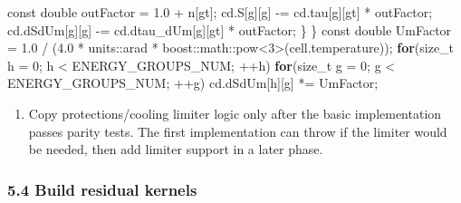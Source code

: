 \documentclass[
]{article}
\newenvironment{Shaded}{}{}
\newcommand{\AttributeTok}[1]{\textcolor[rgb]{0.49,0.56,0.16}{#1}}
\newcommand{\ControlFlowTok}[1]{\textcolor[rgb]{0.00,0.44,0.13}{\textbf{#1}}}
\newcommand{\DataTypeTok}[1]{\textcolor[rgb]{0.56,0.13,0.00}{#1}}
\newcommand{\DecValTok}[1]{\textcolor[rgb]{0.25,0.63,0.44}{#1}}
\newcommand{\ExtensionTok}[1]{#1}
\newcommand{\FloatTok}[1]{\textcolor[rgb]{0.25,0.63,0.44}{#1}}
\newcommand{\NormalTok}[1]{#1}
\newcommand{\OperatorTok}[1]{\textcolor[rgb]{0.40,0.40,0.40}{#1}}
\providecommand{\tightlist}{%
  \setlength{\itemsep}{0pt}\setlength{\parskip}{0pt}}
\begin{document}
\begin{Shaded}
\begin{Highlighting}[]
        \AttributeTok{const} \DataTypeTok{double}\NormalTok{ outFactor }\OperatorTok{=} \FloatTok{1.0} \OperatorTok{+}\NormalTok{ n}\OperatorTok{[}\NormalTok{gt}\OperatorTok{];}
\NormalTok{        cd}\OperatorTok{.}\NormalTok{S}\OperatorTok{[}\NormalTok{g}\OperatorTok{][}\NormalTok{g}\OperatorTok{]} \OperatorTok{{-}=}\NormalTok{ cd}\OperatorTok{.}\NormalTok{tau}\OperatorTok{[}\NormalTok{g}\OperatorTok{][}\NormalTok{gt}\OperatorTok{]} \OperatorTok{*}\NormalTok{ outFactor}\OperatorTok{;}
\NormalTok{        cd}\OperatorTok{.}\NormalTok{dSdUm}\OperatorTok{[}\NormalTok{g}\OperatorTok{][}\NormalTok{g}\OperatorTok{]} \OperatorTok{{-}=}\NormalTok{ cd}\OperatorTok{.}\NormalTok{dtau\_dUm}\OperatorTok{[}\NormalTok{g}\OperatorTok{][}\NormalTok{gt}\OperatorTok{]} \OperatorTok{*}\NormalTok{ outFactor}\OperatorTok{;}
    \OperatorTok{\}}
\OperatorTok{\}}
\AttributeTok{const} \DataTypeTok{double}\NormalTok{ UmFactor }\OperatorTok{=} \FloatTok{1.0} \OperatorTok{/} \OperatorTok{(}\FloatTok{4.0} \OperatorTok{*}\NormalTok{ units}\OperatorTok{::}\NormalTok{arad }\OperatorTok{*} \ExtensionTok{boost::}\NormalTok{math::pow}\OperatorTok{\textless{}}\DecValTok{3}\OperatorTok{\textgreater{}(}\NormalTok{cell}\OperatorTok{.}\NormalTok{temperature}\OperatorTok{));}
\ControlFlowTok{for}\OperatorTok{(}\DataTypeTok{size\_t}\NormalTok{ h }\OperatorTok{=} \DecValTok{0}\OperatorTok{;}\NormalTok{ h }\OperatorTok{\textless{}}\NormalTok{ ENERGY\_GROUPS\_NUM}\OperatorTok{;} \OperatorTok{++}\NormalTok{h}\OperatorTok{)}
    \ControlFlowTok{for}\OperatorTok{(}\DataTypeTok{size\_t}\NormalTok{ g }\OperatorTok{=} \DecValTok{0}\OperatorTok{;}\NormalTok{ g }\OperatorTok{\textless{}}\NormalTok{ ENERGY\_GROUPS\_NUM}\OperatorTok{;} \OperatorTok{++}\NormalTok{g}\OperatorTok{)}
\NormalTok{        cd}\OperatorTok{.}\NormalTok{dSdUm}\OperatorTok{[}\NormalTok{h}\OperatorTok{][}\NormalTok{g}\OperatorTok{]} \OperatorTok{*=}\NormalTok{ UmFactor}\OperatorTok{;}
\end{Highlighting}
\end{Shaded}

\begin{enumerate}
\def\labelenumi{\arabic{enumi}.}
\setcounter{enumi}{3}
\tightlist
\item
  Copy protections/cooling limiter logic only after the basic
  implementation passes parity tests. The first implementation can throw
  if the limiter would be needed, then add limiter support in a later
  phase.
\end{enumerate}

\subsubsection{5.4 Build residual kernels}\label{build-residual-kernels}
\end{document}
